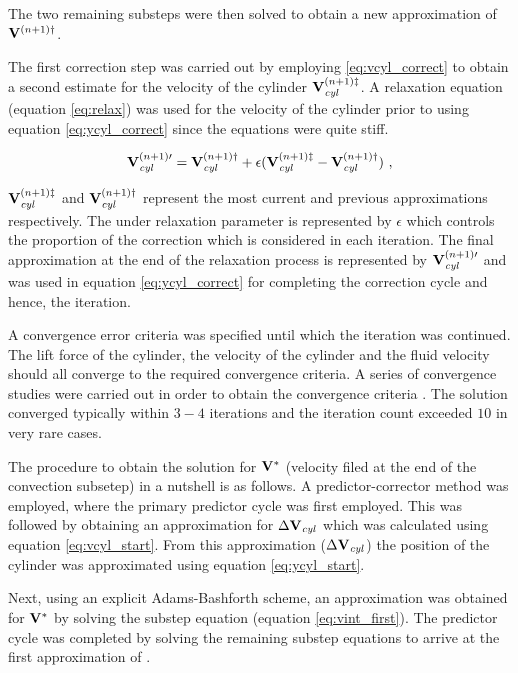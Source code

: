  The two remaining substeps were then solved to obtain a new approximation of $\mathbf{V}^{(n+1)\dag}$. 
 
 The first correction step was carried out by employing \ref{eq:vcyl_correct} to obtain a second estimate for the velocity of the cylinder $\mathbf{V}_{\mathit{cyl}}^{(n+1)\ddag}$. A relaxation equation (equation \ref{eq:relax}) was used for the velocity of the cylinder prior to using equation \ref{eq:ycyl_correct} since the equations were quite stiff.
 
 \begin{equation} \centering
 \label{eq:relax}
 \Vcyl^{(n+1)\prime} = \Vcyl^{(n+1)\dag} + \epsilon(\Vcyl^{(n+1)\ddag} - \Vcyl^{(n+1)\dag}) ~,
 \end{equation}
 
 $\mathbf{V}_{\mathit{cyl}}^{(n+1)\ddag}$ and $\mathbf{V}_{\mathit{cyl}}^{(n+1)\dag}$ represent the most current and previous approximations respectively. The under relaxation parameter is represented by $\epsilon$ which controls the proportion of the correction which is considered in each iteration. The final approximation at the end of the relaxation process is represented by $\mathbf{V}_{\mathit{cyl}}^{(n+1)\prime}$ and was used in equation \ref{eq:ycyl_correct} for completing the correction cycle and hence, the iteration.
 
  A convergence error criteria was specified until which the iteration was continued. The lift force of the cylinder, the velocity of the cylinder and the fluid velocity should all converge to the required convergence criteria. A series of convergence studies were carried out in order to obtain the convergence criteria \citep{Pregnalato:thesis}. The solution converged typically within $3-4$ iterations and the iteration count exceeded $10$ in very rare cases.  
  
  The procedure to obtain the solution for $\mathbf{V}^{*}$ (velocity filed at the end of the convection subsetep) in a nutshell is as follows. A predictor-corrector method was employed, where the primary predictor cycle was first employed. This was followed by obtaining an approximation for $\Delta\mathbf{V}_{\mathit{cyl}}$ which was calculated using equation \ref{eq:vcyl_start}. From this approximation ($\Delta\mathbf{V}_{\mathit{cyl}}$)  the position of the cylinder was approximated using equation \ref{eq:ycyl_start}.
 
 Next, using an explicit Adams-Bashforth scheme, an approximation was obtained for $\mathbf{V}^{*}$ by solving the substep equation (equation \ref{eq:vint_first}). The predictor cycle was completed by solving the remaining substep equations to arrive at the first approximation of \Vnext.   
 
